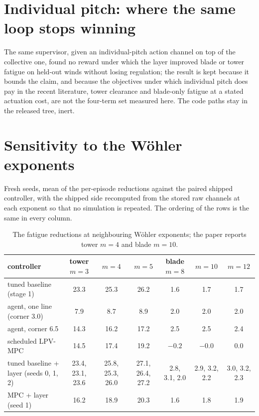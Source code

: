 \documentclass{article}
\begin{document}
\section{Individual pitch: where the same loop stops winning}
\label{app:ipc}
The same supervisor, given an individual-pitch action channel on top of the collective one, found no reward under which the layer improved blade or tower fatigue on held-out winds without losing regulation; the result is kept because it bounds the claim, and because the objectives under which individual pitch does pay in the recent literature, tower clearance and blade-only fatigue at a stated actuation cost, are not the four-term set measured here. The code paths stay in the released tree, inert.

\section{Sensitivity to the W\"ohler exponents}
\label{app:sensitivity}
Fresh seeds, mean of the per-episode reductions against the paired shipped controller, with the shipped side recomputed from the stored raw channels at each exponent so that no simulation is repeated. The ordering of the rows is the same in every column.

\begin{table}[H]
\centering\small
\caption{The fatigue reductions at neighbouring W\"ohler exponents; the paper reports tower $m=4$ and blade $m=10$.}
\label{tab:wohler}
\begin{tabular}{lcccccc}
\toprule
controller & tower $m{=}3$ & $m{=}4$ & $m{=}5$ & blade $m{=}8$ & $m{=}10$ & $m{=}12$ \\
\midrule
tuned baseline (stage 1)        & 23.3 & 25.3 & 26.2 & 1.6 & 1.7 & 1.7 \\
agent, one line (corner 3.0)    & 7.9 & 8.7 & 8.9 & 2.0 & 2.0 & 2.0 \\
agent, corner 6.5               & 14.3 & 16.2 & 17.2 & 2.5 & 2.5 & 2.4 \\
scheduled LPV-MPC               & 14.5 & 17.4 & 19.2 & $-0.2$ & $-0.0$ & 0.0 \\
tuned baseline + layer (seeds 0, 1, 2) & 23.4, 23.1, 23.6 & 25.8, 25.3, 26.0 & 27.1, 26.4, 27.2 & 2.8, 3.1, 2.0 & 2.9, 3.2, 2.2 & 3.0, 3.2, 2.3 \\
MPC + layer (seed 1)            & 16.2 & 18.9 & 20.3 & 1.6 & 1.8 & 1.9 \\
\bottomrule
\end{tabular}
\end{table}
\end{document}
